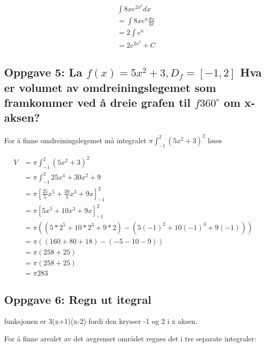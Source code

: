 \documentclass{article}
\begin{document}
\begin{align*}
    & \int 8xe^{2x^2}dx \\
    &= \int 8xe^{u} \frac{du}{4x} \\
    &= 2 \int e^{u} \\ 
    &= 2e^{2x^2} + C
\end{align*}

\subsection{Oppgave 5: La $f(x)=5x^2+3, D_f=[-1, 2]$ Hva er volumet av omdreiningslegemet som framkommer ved å dreie grafen til $f 360^\circ$ om x-aksen?}

For å finne omdreiningslegemet må integralet $\pi \int_{-1}^{2} (5x^2+3)^2$ løses

\begin{align*}
    V &= \pi \int_{-1}^{2} (5x^2+3)^2 \\
    &= \pi \int_{-1}^{2} 25x^4 + 30x^2 + 9 \\
    &= \pi [\frac{25}{5} x^5 + \frac{30}{3} x^3 + 9x]^2_{-1} \\
    &= \pi [5x^5 + 10 x^3 + 9x]^2_{-1} \\
    &= \pi ((5 * 2^5 + 10*2^3 + 9*2) - (5(-1)^2 + 10(-1)^3 + 9(-1))) \\
    &= \pi ((160 + 80 + 18) - (-5-10-9)) \\
    &= \pi (258 + 25) \\ 
    &= \pi (258 + 25) \\
    &= \pi 283
\end{align*}

\subsection{Oppgave 6: Regn ut itegral}

funksjonen er 3(x+1)(x-2) fordi den krysser -1 og 2 i x aksen.

For å finne arealet av det avgrenset området regnes det i tre separate integraler:
\end{document}
